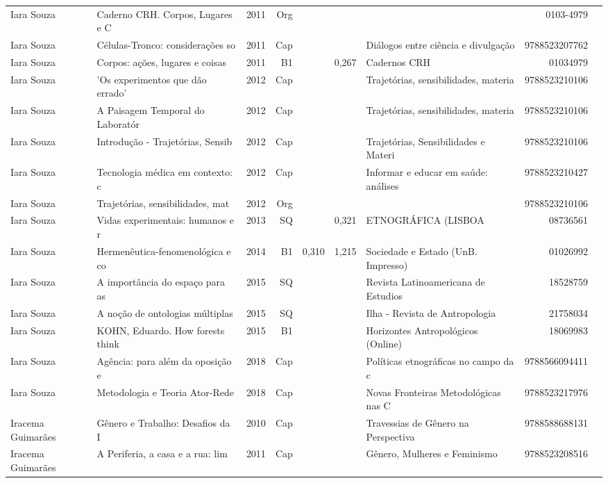 \documentclass[12pt,brazil]{article}\usepackage[]{graphicx}\usepackage[]{xcolor}
\begin{document}
\begin{longtable}{lllrrllrr}
Iara Souza & Caderno CRH. Corpos, Lugares e C & 2011 & Org &  &  &  & 0103-4979 \\
Iara Souza & Células-Tronco: considerações so & 2011 & Cap &  &  & Diálogos entre ciência e divulgação  & 9788523207762 \\
\rowcolor{coautr}Iara Souza & Corpos: ações, lugares e coisas  & 2011 & B1 &  & 0,267 & Cadernos CRH & 01034979 \\
Iara Souza & ’Os experimentos que dão errado’ & 2012 & Cap &  &  & Trajetórias, sensibilidades, materia & 9788523210106 \\
Iara Souza & A Paisagem Temporal do Laboratór & 2012 & Cap &  &  & Trajetórias, sensibilidades, materia & 9788523210106 \\
\rowcolor{coautr}Iara Souza & Introdução - Trajetórias, Sensib & 2012 & Cap &  &  & Trajetórias, Sensibilidades e Materi & 9788523210106 \\
Iara Souza & Tecnologia médica em contexto: c & 2012 & Cap &  &  & Informar e educar em saúde: análises & 9788523210427 \\
Iara Souza & Trajetórias, sensibilidades, mat & 2012 & Org &  &  &  & 9788523210106 \\
Iara Souza & Vidas experimentais: humanos e r & 2013 & SQ &  & 0,321 & ETNOGRÁFICA (LISBOA & 08736561 \\
\rowcolor{coautr}Iara Souza & Hermenêutica-fenomenológica e co & 2014 & B1 & 0,310 & 1,215 & Sociedade e Estado (UnB. Impresso) & 01026992 \\
Iara Souza & A importância do espaço para as  & 2015 & SQ &  &  & Revista Latinoamericana de Estudios  & 18528759 \\
Iara Souza & A noção de ontologias múltiplas  & 2015 & SQ &  &  & Ilha - Revista de Antropologia & 21758034 \\
Iara Souza & KOHN, Eduardo. How forests think & 2015 & B1 &  &  & Horizontes Antropológicos (Online) & 18069983 \\
\rowcolor{coautr}Iara Souza & Agência: para além da oposição e & 2018 & Cap &  &  & Políticas etnográficas no campo da c & 9788566094411 \\
Iara Souza & Metodologia e Teoria Ator-Rede & 2018 & Cap &  &  & Novas Fronteiras Metodológicas nas C & 9788523217976 \\
Iracema Guimarães & Gênero e Trabalho: Desafios da I & 2010 & Cap &  &  & Travessias de Gênero na Perspectiva  & 9788588688131 \\
Iracema Guimarães & A Periferia, a casa e a rua: lim & 2011 & Cap &  &  & Gênero, Mulheres e Feminismo & 9788523208516 \\

\end{longtable}
\end{document}
